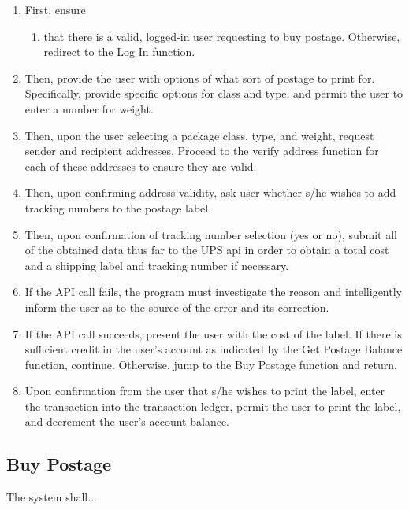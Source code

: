 \documentclass{scrreprt}
\begin{document}
\begin{enumerate}
\item First, ensure
\begin{enumerate}
\item that there is a valid, logged-in user requesting to buy postage.
Otherwise, redirect to the Log In function.
\end{enumerate}
\item Then, provide the user with options of what sort of postage to print 
for. Specifically, provide specific options for class and type, and permit 
the user to enter a number for weight.
\item Then, upon the user selecting a package class, type, and weight, 
request sender and recipient addresses. Proceed to the verify address function 
for each of these addresses to ensure they are valid.
\item Then, upon confirming address validity, ask user whether s/he wishes to 
add tracking numbers to the postage label.
\item Then, upon confirmation of tracking number selection (yes or no), submit 
all of the obtained data thus far to the UPS api in order to obtain a total 
cost and a shipping label and tracking number if necessary.
\item If the API call fails, the program must investigate the reason and 
intelligently inform the user as to the source of the error and its correction.
\item If the API call succeeds, present the user with the cost of the 
label. If there is sufficient credit in the user's account as indicated by the
Get Postage Balance function, continue.  Otherwise, jump to the Buy Postage
function and return.
\item Upon confirmation from the user that s/he wishes to print the label,
enter the transaction into the transaction ledger, permit the user to print the
label, and decrement the user's account balance.
\end{enumerate}

\subsection{Buy Postage}

The system shall...
\end{document}
